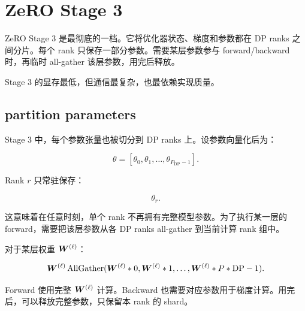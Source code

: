 \section{ZeRO Stage 3}
\label{sec:zero-stage3}

ZeRO Stage 3 是最彻底的一档。它将优化器状态、梯度和参数都在 DP ranks 之间分片。每个 rank 只保存一部分参数。需要某层参数参与 forward/backward 时，再临时 all-gather 该层参数，用完后释放。

Stage 3 的显存最低，但通信最复杂，也最依赖实现质量。

\subsection{partition parameters}
\label{subsec:zero3-partition-parameters}

Stage 3 中，每个参数张量也被切分到 DP ranks 上。设参数向量化后为：

\[
\theta=[\theta_0,\theta_1,\ldots,\theta_{P_{\mathrm{DP}}-1}].
\]

Rank $r$ 只常驻保存：

\[
\theta_r.
\]

这意味着在任意时刻，单个 rank 不再拥有完整模型参数。为了执行某一层的 forward，需要把该层参数从各 DP ranks all-gather 到当前计算 rank 组中。

对于某层权重 $\bm{W}^{(\ell)}$：

\[
\bm{W}^{(\ell)}
\operatorname{AllGather}
(
\bm{W}^{(\ell)}*0,
\bm{W}^{(\ell)}*1,
\ldots,
\bm{W}^{(\ell)}*{P*{\mathrm{DP}}-1}
).
\]

Forward 使用完整 $\bm{W}^{(\ell)}$ 计算。Backward 也需要对应参数用于梯度计算。用完后，可以释放完整参数，只保留本 rank 的 shard。

